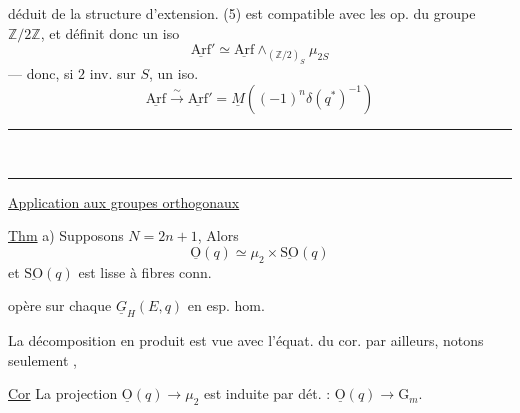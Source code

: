 déduit de la structure d'extension.  (5) est compatible avec les op. du groupe $\mathbb Z/2\mathbb Z$, et définit donc un iso
\[
\underline{\mathrm{Arf}}'\simeq\underline{\mathrm{Arf}}\mathbin{\wedge}_{(\mathbb Z/2)_S}\mu_{2S}\tag*{(7)}
\]
--- donc, si $2$ inv. sur $S$, un iso.
\[
\underline{\mathrm{Arf}}\xrightarrow{\sim}\underline{\mathrm{Arf}}'=\underline M((-1)^n\delta(q^{*})^{-1})
\]


\begin{center}\rule{.24\linewidth}{.4pt}\\[-.5ex]\rule{.15\linewidth}{.4pt}\end{center}

\uline{Application aux groupes orthogonaux}

\uline{Thm} a) Supposons $N=2n+1$, Alors
\[
\underline{\mathrm O}(q)\simeq\mu_2\times\underline{\mathrm{SO}}(q)
\]
et $\underline{\mathrm{SO}}(q)$ est  lisse à fibres conn.

 opère sur chaque $\underline{G}_H(E,q)$   en esp. hom. %

La décomposition en produit est vue avec l'équat. du cor. par ailleurs, notons seulement  ,

\uline{Cor} La projection $\underline{\mathrm O}(q)\longrightarrow\mu_2$ est induite par dét. : $\underline{\mathrm O}(q)\longrightarrow\mathrm G_m$.

